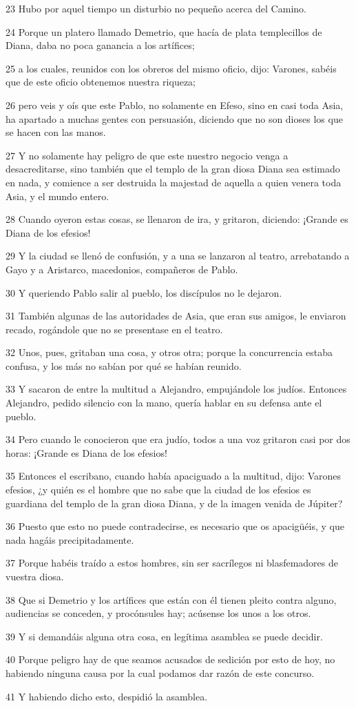 \par 23 Hubo por aquel tiempo un disturbio no pequeño acerca del Camino.
\par 24 Porque un platero llamado Demetrio, que hacía de plata templecillos de Diana, daba no poca ganancia a los artífices;
\par 25 a los cuales, reunidos con los obreros del mismo oficio, dijo: Varones, sabéis que de este oficio obtenemos nuestra riqueza;
\par 26 pero veis y oís que este Pablo, no solamente en Efeso, sino en casi toda Asia, ha apartado a muchas gentes con persuasión, diciendo que no son dioses los que se hacen con las manos.
\par 27 Y no solamente hay peligro de que este nuestro negocio venga a desacreditarse, sino también que el templo de la gran diosa Diana sea estimado en nada, y comience a ser destruida la majestad de aquella a quien venera toda Asia, y el mundo entero.
\par 28 Cuando oyeron estas cosas, se llenaron de ira, y gritaron, diciendo: ¡Grande es Diana de los efesios!
\par 29 Y la ciudad se llenó de confusión, y a una se lanzaron al teatro, arrebatando a Gayo y a Aristarco, macedonios, compañeros de Pablo.
\par 30 Y queriendo Pablo salir al pueblo, los discípulos no le dejaron.
\par 31 También algunas de las autoridades de Asia, que eran sus amigos, le enviaron recado, rogándole que no se presentase en el teatro.
\par 32 Unos, pues, gritaban una cosa, y otros otra; porque la concurrencia estaba confusa, y los más no sabían por qué se habían reunido.
\par 33 Y sacaron de entre la multitud a Alejandro, empujándole los judíos. Entonces Alejandro, pedido silencio con la mano, quería hablar en su defensa ante el pueblo.
\par 34 Pero cuando le conocieron que era judío, todos a una voz gritaron casi por dos horas: ¡Grande es Diana de los efesios!
\par 35 Entonces el escribano, cuando había apaciguado a la multitud, dijo: Varones efesios, ¿y quién es el hombre que no sabe que la ciudad de los efesios es guardiana del templo de la gran diosa Diana, y de la imagen venida de Júpiter?
\par 36 Puesto que esto no puede contradecirse, es necesario que os apacigüéis, y que nada hagáis precipitadamente.
\par 37 Porque habéis traído a estos hombres, sin ser sacrílegos ni blasfemadores de vuestra diosa.
\par 38 Que si Demetrio y los artífices que están con él tienen pleito contra alguno, audiencias se conceden, y procónsules hay; acúsense los unos a los otros.
\par 39 Y si demandáis alguna otra cosa, en legítima asamblea se puede decidir.
\par 40 Porque peligro hay de que seamos acusados de sedición por esto de hoy, no habiendo ninguna causa por la cual podamos dar razón de este concurso.
\par 41 Y habiendo dicho esto, despidió la asamblea.

